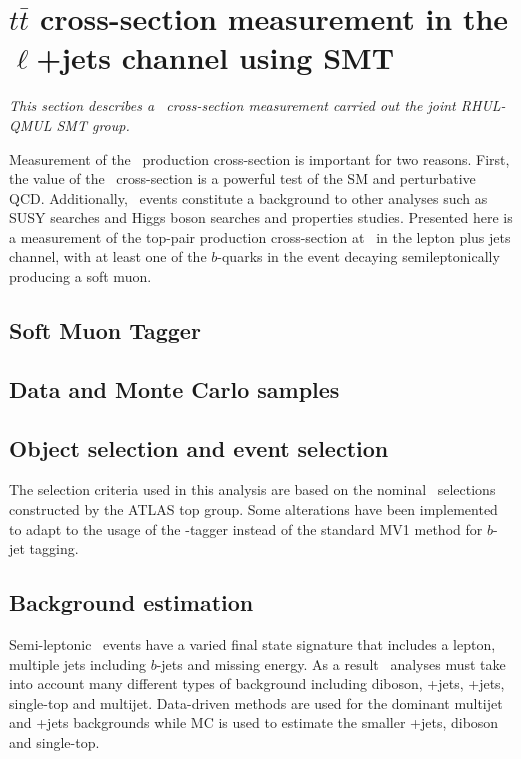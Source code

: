 
\chapter{$t\bar{t}$ cross-section measurement in the $\ell$+jets channel using SMT} \label{prt:cross_section}

\textit{This section describes a \ttbar\ cross-section measurement carried out the joint RHUL-QMUL SMT group. }

Measurement of the \ttbar\ production cross-section is important for two reasons. First, the value of the \ttbar\ cross-section is a powerful test of the SM and perturbative QCD. Additionally, \ttbar\ events constitute a background to other analyses such as SUSY searches and Higgs boson searches and properties studies. Presented here is a measurement of the top-pair production cross-section at \cmsS\ in the lepton plus jets channel, with at least one of the $b$-quarks in the event decaying semileptonically producing a soft muon. 

\section{Soft Muon Tagger} \label{sec:CrossSectionSMT}


\section{Data and Monte Carlo samples} \label{sec:CrossSectionSamplesMC}

\section{Object selection and event selection} \label{sec:CrossSectionEventSelection}
The selection criteria used in this analysis are based on the nominal \cmsS\ selections constructed by the ATLAS top group. Some alterations have been implemented to adapt to the usage of the \xsm-tagger instead of the standard MV1 method for $b$-jet tagging.

\section{Background estimation} \label{sec:CrossSectionBacgkround}

Semi-leptonic \ttbar\ events have a varied final state signature that includes a lepton, multiple jets including $b$-jets and missing energy. As a result \ttbar\ analyses must take into account many different types of background including diboson, \W+jets, \Z+jets, single-top and multijet. Data-driven methods are used for the dominant multijet and \W+jets backgrounds while MC is used to estimate the smaller \Z+jets, diboson and single-top.

